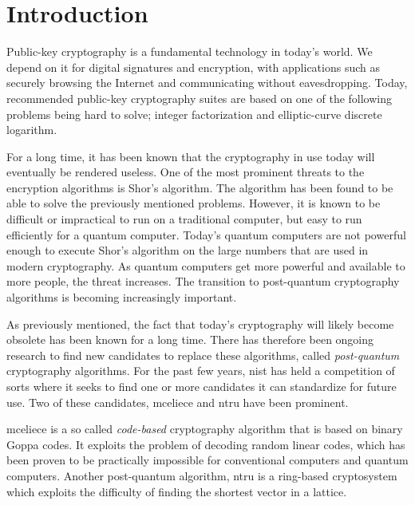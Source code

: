 \chapter{Introduction}
\label{chapter:introduction}


Public-key cryptography is a fundamental technology in today's world. We depend on it for digital signatures and encryption, with applications such as securely browsing the Internet and communicating without eavesdropping. Today, recommended public-key cryptography suites are based on one of the following problems being hard to solve; integer factorization and elliptic-curve discrete logarithm\cite{nsa2015, nist2019}.

For a long time, it has been known that the cryptography in use today will eventually be rendered useless. One of the most prominent threats to the encryption algorithms is Shor's algorithm\cite{shor1997}. The algorithm has been found to be able to solve the previously mentioned problems. However, it is known to be difficult or impractical to run on a traditional computer, but easy to run efficiently for a quantum computer. Today's quantum computers are not powerful enough to execute Shor's algorithm on the large numbers that are used in modern cryptography. As quantum computers get more powerful and available to more people, the threat increases. The transition to post-quantum cryptography algorithms is becoming increasingly important.


As previously mentioned, the fact that today's cryptography will likely become obsolete has been known for a long time. There has therefore been ongoing research to find new candidates to replace these algorithms, called \textit{post-quantum} cryptography algorithms. For the past few years, \gls{nist} has held a competition of sorts where it seeks to find one or more candidates it can standardize for future use. Two of these candidates, \gls{mceliece} and \gls{ntru} have been prominent\cite{nist2020}.

\gls{mceliece} is a so called \textit{code-based} cryptography algorithm that is based on binary Goppa codes. It exploits the problem of decoding random linear codes, which has been proven to be practically impossible for conventional computers and quantum computers\cite{mceliece1978}. Another post-quantum algorithm, \gls{ntru} is a ring-based cryptosystem which exploits the difficulty of finding the shortest vector in a lattice\cite{ntru1998}.

